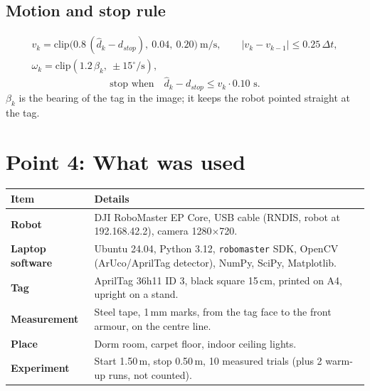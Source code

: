 \documentclass[11pt,a4paper]{article}
\begin{document}
\subsection*{Motion and stop rule}
\begin{gather}
v_k=\mathrm{clip}\big(0.8\,(\hat d_k-d_{stop}),\ 0.04,\ 0.20\big)\ \text{m/s},\qquad |v_k-v_{k-1}|\le 0.25\,\Delta t,\label{eq:v}\\
\omega_k=\mathrm{clip}(1.2\,\beta_k,\ \pm15^\circ\!/\text{s}),\nonumber
\end{gather}
\begin{equation}\label{eq:stop}
\text{stop when}\quad \hat d_k-d_{stop}\le v_k\cdot 0.10\text{ s}.
\end{equation}
$\beta_k$ is the bearing of the tag in the image; it keeps the robot pointed straight at the tag.

\section{Point 4: What was used}
\begin{center}\small
\begin{tabularx}{\linewidth}{@{}>{\bfseries}p{3.6cm}X@{}}
\toprule
\textnormal{\textbf{Item}} & \textbf{Details}\\
\midrule
Robot & DJI RoboMaster EP Core, USB cable (RNDIS, robot at 192.168.42.2), camera 1280$\times$720.\\
Laptop software & Ubuntu 24.04, Python 3.12, \texttt{robomaster} SDK, OpenCV (ArUco/AprilTag detector), NumPy, SciPy, Matplotlib.\\
Tag & AprilTag 36h11 ID 3, black square 15\,cm, printed on A4, upright on a stand.\\
Measurement & Steel tape, 1\,mm marks, from the tag face to the front armour, on the centre line.\\
Place & Dorm room, carpet floor, indoor ceiling lights.\\
Experiment & Start 1.50\,m, stop 0.50\,m, 10 measured trials (plus 2 warm-up runs, not counted).\\
\bottomrule
\end{tabularx}
\end{center}

\end{document}
